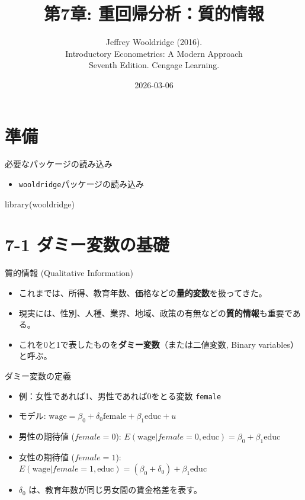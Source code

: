 \documentclass[
  ignorenonframetext,
]{beamer}
\title{第7章: 重回帰分析：質的情報}
\subtitle{Jeffrey Wooldridge (2016).\\
Introductory Econometrics: A Modern Approach\\
Seventh Edition. Cengage Learning.}
\author{}
\date{\vspace{-2.5em}2026-03-06}
\newenvironment{Shaded}{\begin{snugshade}}{\end{snugshade}}
\newcommand{\FunctionTok}[1]{\textcolor[rgb]{0.00,0.00,0.00}{#1}}
\newcommand{\NormalTok}[1]{#1}
\providecommand{\tightlist}{%
  \setlength{\itemsep}{0pt}\setlength{\parskip}{0pt}}
\begin{document}
\frame{\titlepage}

\hypertarget{ux6e96ux5099}{%
\section{準備}\label{ux6e96ux5099}}

\begin{frame}[fragile]{必要なパッケージの読み込み}
\protect\hypertarget{ux5fc5ux8981ux306aux30d1ux30c3ux30b1ux30fcux30b8ux306eux8aadux307fux8fbcux307f}{}
\begin{itemize}
\tightlist
\item
  \texttt{wooldridge}パッケージの読み込み
\end{itemize}

\begin{Shaded}
\begin{Highlighting}[]
\FunctionTok{library}\NormalTok{(wooldridge)}
\end{Highlighting}
\end{Shaded}
\end{frame}

\hypertarget{ux30c0ux30dfux30fcux5909ux6570ux306eux57faux790e}{%
\section{7-1
ダミー変数の基礎}\label{ux30c0ux30dfux30fcux5909ux6570ux306eux57faux790e}}

\begin{frame}{質的情報 (Qualitative Information)}
\protect\hypertarget{ux8ceaux7684ux60c5ux5831-qualitative-information}{}
\begin{itemize}
\tightlist
\item
  これまでは、所得、教育年数、価格などの\textbf{量的変数}を扱ってきた。
\item
  現実には、性別、人種、業界、地域、政策の有無などの\textbf{質的情報}も重要である。
\item
  これを0と1で表したものを\textbf{ダミー変数}（または二値変数, Binary
  variables）と呼ぶ。
\end{itemize}
\end{frame}

\begin{frame}[fragile]{ダミー変数の定義}
\protect\hypertarget{ux30c0ux30dfux30fcux5909ux6570ux306eux5b9aux7fa9}{}
\begin{itemize}
\tightlist
\item
  例：女性であれば1、男性であれば0をとる変数 \texttt{female}
\item
  モデル:
  \(\text{wage} = \beta_0 + \delta_0 \text{female} + \beta_1 \text{educ} + u\)
\item
  男性の期待値 (\(female=0\)):
  \(E(\text{wage} | female=0, \text{educ}) = \beta_0 + \beta_1 \text{educ}\)
\item
  女性の期待値 (\(female=1\)):
  \(E(\text{wage} | female=1, \text{educ}) = (\beta_0 + \delta_0) + \beta_1 \text{educ}\)
\item
  \(\delta_0\) は、教育年数が同じ男女間の賃金格差を表す。
\end{itemize}
\end{frame}
\end{document}
